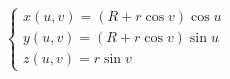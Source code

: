 \documentclass[preview]{standalone}
\begin{document}
\begin{align*}
\begin{cases}
            x(u,v) = (R + r \cos v)\cos u \\
            y(u,v) = (R + r \cos v)\sin u \\
            z(u,v) = r \sin v
            \end{cases}
\end{align*}
\end{document}
